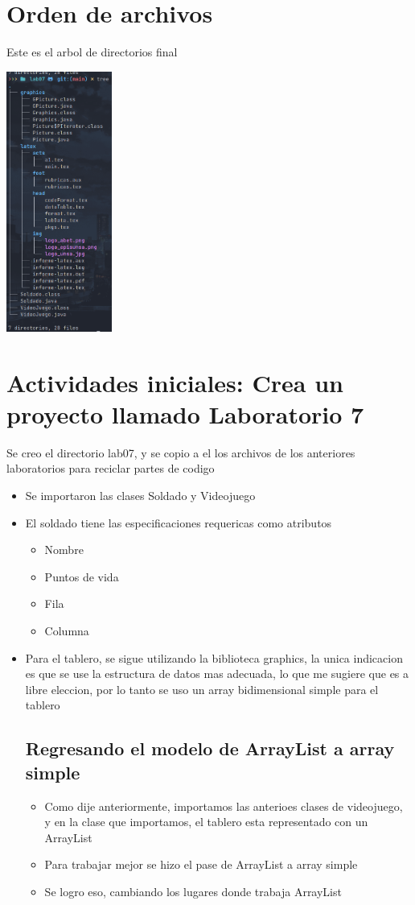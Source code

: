\section{Orden de archivos}
Este es el arbol de directorios final

\includegraphics [width=0.26\textwidth] {img/tree.jpg}


\section{Actividades iniciales: Crea un proyecto llamado Laboratorio 7}
Se creo el directorio lab07, y se copio a el los archivos de los anteriores laboratorios para reciclar partes de codigo

\begin{itemize}
  \item Se importaron las clases Soldado y Videojuego
  \item El soldado tiene las especificaciones requericas como atributos
  \begin{itemize}
    \item Nombre
    \item Puntos de vida
    \item Fila
    \item Columna
  \end{itemize}
  \item Para el tablero, se sigue utilizando la biblioteca graphics, la unica indicacion es que se use la estructura de datos mas adecuada, lo que me sugiere que es a libre eleccion, por lo tanto se uso un array bidimensional simple para el tablero

  \subsection{Regresando el modelo de ArrayList a array simple}
  \begin{itemize}
    \item Como dije anteriormente, importamos las anterioes clases de videojuego, y en la clase que importamos, el tablero esta representado con un ArrayList
    \item Para trabajar mejor se hizo el pase de ArrayList a array simple
    \item Se logro eso, cambiando los lugares donde trabaja ArrayList
  \end{itemize}

\end{itemize}
